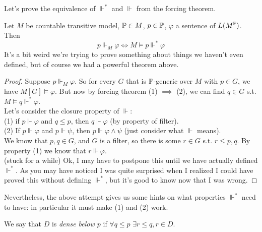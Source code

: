 \documentclass[a4paper]{article}
\begin{document}
Let's prove the equivalence of $\Vdash^*$ and $\Vdash$ from the forcing theorem.

\begin{prop}
Let $M$ be countable transitive model, $\P \in M$, $p \in \P$, $\varphi$ a sentence of $L(M^\P)$. Then
\[
p \Vdash_M \varphi \iff M \vDash p \Vdash^* \varphi
\]
It's a bit weird we're trying to prove something about things we haven't even defined, but of course we had a powerful theorem above.
\begin{proof}
Suppose $p \Vdash_M \varphi$. So for every $G$ that is $\P$-generic over $M$ with $p \in G$, we have $M[G] \vDash \varphi$. But now by forcing theorem (1) $\implies$ (2), we can find $q \in G$ s.t. $M \vDash q \Vdash^* \varphi$.\\
Let's consider the closure property of $\Vdash$:\\
(1) if $p \Vdash \varphi$ and $q \leq p$, then $q \Vdash \varphi$ (by property of filter).\\
(2) If $p \Vdash \varphi$ and $p \Vdash \psi$, then $p \Vdash \varphi \wedge \psi$ (just consider what $\Vdash$ means).\\
We know that $p,q \in G$, and $G$ is a filter, so there is some $r \in G$ s.t. $r \leq p,q$. By property (1) we know that $r \Vdash \varphi$.\\
(stuck for a while) Ok, I may have to postpone this until we have actually defined $\Vdash^*$. As you may have noticed I was quite surprised when I realized I could have proved this without defining $\Vdash^*$, but it's good to know now that I was wrong.
\end{proof}
\end{prop}

Nevertheless, the above attempt gives us some hints on what properties $\Vdash^*$ need to have: in particular it must make (1) and (2) work.

\begin{defi}
We say that $D$ is \emph{dense below $p$} if $\forall q \leq p$ $\exists r \leq q, r \in D$.
\end{defi}
\end{document}
